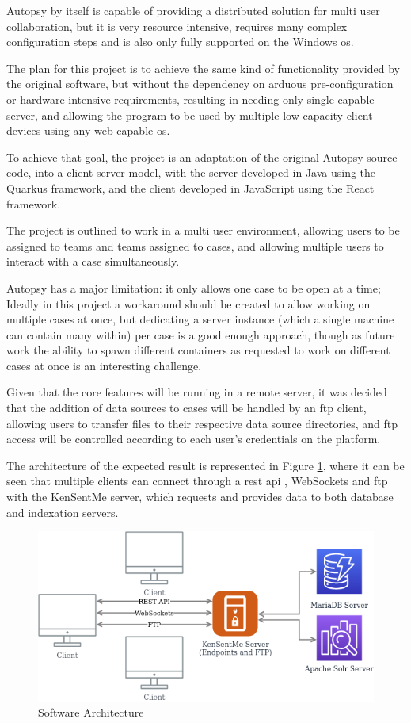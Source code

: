Autopsy by itself is capable of providing a distributed solution for multi user collaboration, but it is very resource intensive, requires many complex configuration steps
and is also only fully supported on the Windows \acrshort{os}.

The plan for this project is to achieve the same kind of functionality provided by the original software, but without the dependency on arduous pre-configuration
or hardware intensive requirements, resulting in needing only single capable server, and allowing the program to be used by multiple low capacity client devices using 
any web capable \acrshort{os}.

To achieve that goal, the project is an adaptation of the original Autopsy source code, into a client-server model, with the server developed in Java \cite{java} using the Quarkus \cite{quarkus} framework,
and the client developed in JavaScript \cite{javascript} using the React \cite{react} framework.

The project is outlined to work in a multi user environment, allowing users to be assigned to teams and teams assigned to cases, and allowing multiple users to interact with
a case simultaneously.

Autopsy has a major limitation: it only allows one case to be open at a time; Ideally in this project a workaround should be created to allow working on multiple cases
at once, but dedicating a server instance (which a single machine can contain many within) per case is a good enough approach, though as future work the
ability to spawn different containers as requested to work on different cases at once is an interesting challenge.

Given that the core features will be running in a remote server, it was decided that the addition of data sources to cases will be handled by an \acrshort{ftp} \cite{ftp} client, allowing users
to transfer files to their respective data source directories, and \acrshort{ftp} access will be controlled according to each user's credentials on the platform.

The architecture of the expected result is represented in Figure \ref{fig:arch}, where it can be seen that multiple clients can connect through a \acrshort{rest} \acrshort{api} \cite{rest}, WebSockets and \acrshort{ftp} with the KenSentMe server, 
which requests and provides data to both database and indexation servers.

\begin{figure}[ht]
 \centering
 \includegraphics[width=0.75\linewidth]{imgs/arch.png}
 \caption{Software Architecture}
 \label{fig:arch}
\end{figure}

